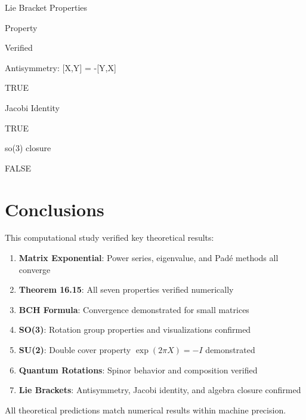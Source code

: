 \documentclass[
]{book}
\newenvironment{Shaded}{\begin{snugshade}}{\end{snugshade}}
\newcommand{\AttributeTok}[1]{\textcolor[rgb]{0.13,0.29,0.53}{#1}}
\newcommand{\ConstantTok}[1]{\textcolor[rgb]{0.56,0.35,0.01}{#1}}
\newcommand{\DecValTok}[1]{\textcolor[rgb]{0.00,0.00,0.81}{#1}}
\newcommand{\FunctionTok}[1]{\textcolor[rgb]{0.13,0.29,0.53}{\textbf{#1}}}
\newcommand{\NormalTok}[1]{#1}
\newcommand{\SpecialCharTok}[1]{\textcolor[rgb]{0.81,0.36,0.00}{\textbf{#1}}}
\newcommand{\StringTok}[1]{\textcolor[rgb]{0.31,0.60,0.02}{#1}}
\providecommand{\tightlist}{%
  \setlength{\itemsep}{0pt}\setlength{\parskip}{0pt}}
\theoremstyle{definition}
\theoremstyle{definition}
\theoremstyle{definition}
\theoremstyle{definition}
\theoremstyle{remark}
\begin{document}
\begin{Shaded}
\end{Shaded}

\label{tab:lie-bracket}Lie Bracket Properties

Property

Verified

Antisymmetry: {[}X,Y{]} = -{[}Y,X{]}

TRUE

Jacobi Identity

TRUE

so(3) closure

FALSE

\section{Conclusions}\label{conclusions}

This computational study verified key theoretical results:

\begin{enumerate}
\def\labelenumi{\arabic{enumi}.}
\tightlist
\item
  \textbf{Matrix Exponential}: Power series, eigenvalue, and Padé methods all converge
\item
  \textbf{Theorem 16.15}: All seven properties verified numerically
\item
  \textbf{BCH Formula}: Convergence demonstrated for small matrices
\item
  \textbf{SO(3)}: Rotation group properties and visualizations confirmed
\item
  \textbf{SU(2)}: Double cover property \(\exp(2\pi X) = -I\) demonstrated
\item
  \textbf{Quantum Rotations}: Spinor behavior and composition verified
\item
  \textbf{Lie Brackets}: Antisymmetry, Jacobi identity, and algebra closure confirmed
\end{enumerate}

All theoretical predictions match numerical results within machine precision.


\end{document}
